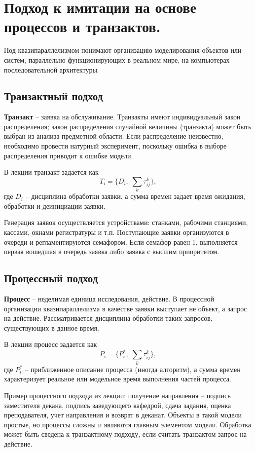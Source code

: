\section{Подход к имитации на основе процессов и транзактов.}

Под квазипараллелизмом понимают организацию моделирования объектов или систем, параллельно функционирующих в реальном мире, на компьютерах последовательной архитектуры.

\subsection*{Транзактный подход}

\textbf{Транзакт} -- заявка на обслуживание. Транзакты имеют индивидуальный закон распределения; закон распределения случайной величины (транзакта) может быть выбран из анализа предметной области. Если распределение неизвестно, необходимо провести натурный эксперимент, поскольку ошибка в выборе распределения приводит к ошибке модели.

В лекции транзакт задается как
\[
  T_i = \{D_i,\; \sum_k \tau^k_{ij}\},
\]
где $D_i$ -- дисциплина обработки заявки, а сумма времен задает время ожидания, обработки и деинициации заявки.

Генерация заявок осуществляется устройствами: станками, рабочими станциями, кассами, окнами регистратуры и т.п. Поступающие заявки организуются в очереди и регламентируются семафором. Если семафор равен 1, выполняется первая вошедшая в очередь заявка либо заявка с высшим приоритетом.

\subsection*{Процессный подход}

\textbf{Процесс} -- неделимая единица исследования, действие. В процессной организации квазипараллелизма в качестве заявки выступает не объект, а запрос на действие. Рассматривается дисциплина обработки таких запросов, существующих в данное время.

В лекции процесс задается как
\[
  P_i = \{P_i^*,\; \sum_k \tau^k_{ij}\},
\]
где $P_i^*$ -- приближенное описание процесса (иногда алгоритм), а сумма времен характеризует реальное или модельное время выполнения частей процесса.

Пример процессного подхода из лекции: получение направления -- подпись заместителя декана, подпись заведующего кафедрой, сдача задания, оценка преподавателя, учет направления и возврат в деканат. Объекты в такой модели простые, но процессы сложны и являются главным элементом модели. Обработка может быть сведена к транзактному подходу, если считать транзактом запрос на действие.

\clearpage
